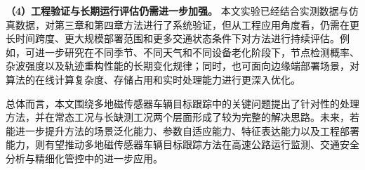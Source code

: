 \documentclass{xdupgthesis}
\begin{document}
\noindent\textbf{（4）工程验证与长期运行评估仍需进一步加强。} 本文实验已经结合实测数据与仿真数据，对第三章和第四章方法进行了系统验证，但从工程应用角度看，仍需在更长时间跨度、更大规模部署范围和更多交通状态条件下对方法进行持续评估。例如，可进一步研究在不同季节、不同天气和不同设备老化阶段下，节点检测概率、杂波强度以及轨迹重构性能的长期变化规律；同时，也可面向边缘端部署场景，对算法的在线计算复杂度、存储占用和实时处理能力进行更深入优化。

总体而言，本文围绕多地磁传感器车辆目标跟踪中的关键问题提出了针对性的处理方法，并在常态工况与长缺测工况两个层面形成了较为完整的解决思路。未来，若能进一步提升方法的场景泛化能力、参数自适应能力、特征表达能力以及工程部署能力，则有望推动多地磁传感器车辆目标跟踪方法在高速公路运行监测、交通安全分析与精细化管控中的进一步应用。
\end{document}
